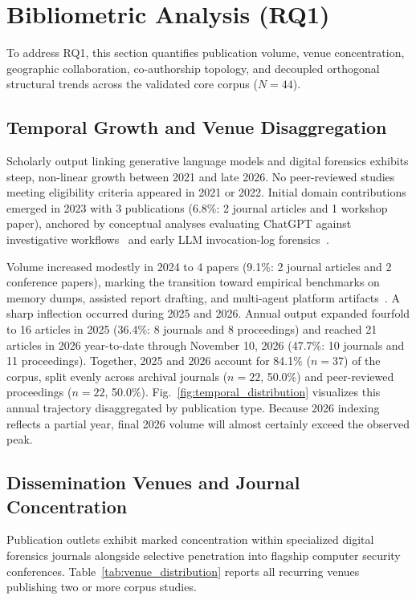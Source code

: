 \section{Bibliometric Analysis (RQ1)}
\label{sec:bibliometrics}

To address RQ1, this section quantifies publication volume, venue concentration, geographic collaboration, co-authorship topology, and decoupled orthogonal structural trends across the validated core corpus ($N=44$).

\subsection{Temporal Growth and Venue Disaggregation}
Scholarly output linking generative language models and digital forensics exhibits steep, non-linear growth between 2021 and late 2026. No peer-reviewed studies meeting eligibility criteria appeared in 2021 or 2022. Initial domain contributions emerged in 2023 with 3 publications (6.8\%: 2 journal articles and 1 workshop paper), anchored by conceptual analyses evaluating ChatGPT against investigative workflows~\cite{scanlon2023_digital, scanlon2023_chatgpt} and early LLM invocation-log forensics~\cite{chernyshev2023_towards}.

Volume increased modestly in 2024 to 4 papers (9.1\%: 2 journal articles and 2 conference papers), marking the transition toward empirical benchmarks on memory dumps, assisted report drafting, and multi-agent platform artifacts~\cite{oh2024_volgpt, michelet2024_chatgpt, walker2024_forensic}. A sharp inflection occurred during 2025 and 2026. Annual output expanded fourfold to 16 articles in 2025 (36.4\%: 8 journals and 8 proceedings) and reached 21 articles in 2026 year-to-date through November 10, 2026 (47.7\%: 10 journals and 11 proceedings). Together, 2025 and 2026 account for 84.1\% ($n=37$) of the corpus, split evenly across archival journals ($n=22$, 50.0\%) and peer-reviewed proceedings ($n=22$, 50.0\%). Fig.~\ref{fig:temporal_distribution} visualizes this annual trajectory disaggregated by publication type. Because 2026 indexing reflects a partial year, final 2026 volume will almost certainly exceed the observed peak.



\subsection{Dissemination Venues and Journal Concentration}
Publication outlets exhibit marked concentration within specialized digital forensics journals alongside selective penetration into flagship computer security conferences. Table~\ref{tab:venue_distribution} reports all recurring venues publishing two or more corpus studies.

